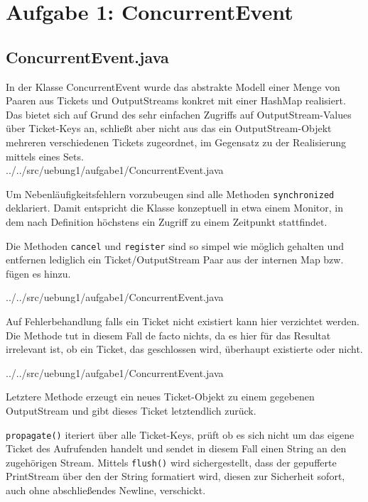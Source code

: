 \section*{Aufgabe 1: ConcurrentEvent}

\subsection*{ConcurrentEvent.java}

In der Klasse ConcurrentEvent wurde das abstrakte Modell einer Menge von Paaren aus Tickets und OutputStreams konkret mit einer HashMap realisiert. Das bietet sich auf Grund des sehr einfachen Zugriffs auf OutputStream-Values über Ticket-Keys an, schließt aber nicht aus das ein OutputStream-Objekt mehreren verschiedenen Tickets zugeordnet, im Gegensatz zu der Realisierung mittels eines Sets.\\


{../../src/uebung1/aufgabe1/ConcurrentEvent.java}

Um Nebenläufigkeitsfehlern vorzubeugen sind alle Methoden {\tt synchronized} deklariert. Damit entspricht die Klasse konzeptuell in etwa einem Monitor, in dem nach Definition höchstens ein Zugriff zu einem Zeitpunkt stattfindet.

Die Methoden {\tt cancel} und {\tt register} sind so simpel wie möglich gehalten und entfernen lediglich ein Ticket/OutputStream Paar aus der internen Map bzw. fügen es hinzu.


{../../src/uebung1/aufgabe1/ConcurrentEvent.java}

Auf Fehlerbehandlung falls ein Ticket nicht existiert kann hier verzichtet werden. Die Methode tut in diesem Fall de facto nichts, da es hier für das Resultat irrelevant ist, ob ein Ticket, das geschlossen wird, überhaupt existierte oder nicht.


{../../src/uebung1/aufgabe1/ConcurrentEvent.java}

Letztere Methode erzeugt ein neues Ticket-Objekt zu einem gegebenen OutputStream und gibt dieses Ticket letztendlich zurück.

{\tt propagate()} iteriert über alle Ticket-Keys, prüft ob es sich nicht um das eigene Ticket des Aufrufenden handelt und sendet in diesem Fall  einen String an den zugehörigen Stream. Mittels {\tt flush()} wird sichergestellt, dass der gepufferte PrintStream über den der String formatiert wird, diesen zur Sicherheit sofort, auch ohne abschließendes Newline, verschickt.

